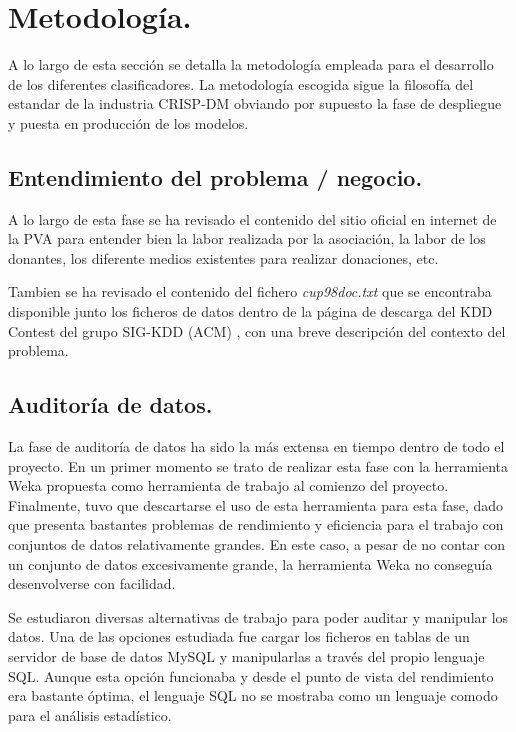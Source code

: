 \section{Metodología.}

A lo largo de esta sección se detalla la metodología empleada para el desarrollo de los diferentes clasificadores. La metodología escogida sigue la filosofía del estandar de la industria CRISP-DM obviando por supuesto la fase de despliegue y puesta en producción de los modelos.

\subsection{Entendimiento del problema / negocio.}

A lo largo de esta fase se ha revisado el contenido del sitio oficial en internet de la PVA para entender bien la labor realizada por la asociación, la labor de los donantes, los diferente medios existentes para realizar donaciones, etc. 

Tambien se ha revisado el contenido del fichero \emph{cup98doc.txt} que se encontraba disponible junto los ficheros de datos dentro de la página de descarga del KDD Contest \cite{KDD-CUP-1998} del grupo SIG-KDD (ACM) \cite{SIGKDD-ACM}, con una breve descripción del contexto del problema.

\subsection{Auditoría de datos.}

La fase de auditoría de datos ha sido la más extensa en tiempo dentro de todo el proyecto. En un primer momento se trato de realizar esta fase con la herramienta Weka \cite{WEKA} propuesta como herramienta de trabajo al comienzo del proyecto. Finalmente, tuvo que descartarse el uso de esta herramienta para esta fase, dado que presenta bastantes problemas de rendimiento y eficiencia para el trabajo con conjuntos de datos relativamente grandes. En este caso, a pesar de no contar con un conjunto de datos excesivamente grande, la herramienta Weka no conseguía desenvolverse con facilidad.

Se estudiaron diversas alternativas de trabajo para poder auditar y manipular los datos. Una de las opciones estudiada fue cargar los ficheros en tablas de un servidor de base de datos MySQL y manipularlas a través del propio lenguaje SQL. Aunque esta opción funcionaba y desde el punto de vista del rendimiento era bastante óptima, el lenguaje SQL no se mostraba como un lenguaje comodo para el análisis estadístico.

